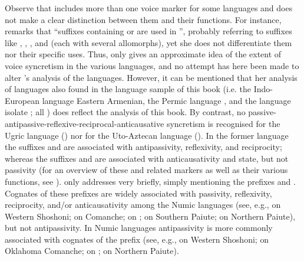 Observe that \citet{geniusiene:1987} includes more than one voice marker for some languages and does not make a clear distinction between them and their functions. For instance, \citet[305]{geniusiene:1987} remarks that “suffixes containing  or  are used in ”, probably referring to suffixes like , , , and  (each with several allomorphs), yet she does not differentiate them nor their specific uses. Thus,  only gives an approximate idea of the extent of voice syncretism in the various languages, and no attempt has here been made to alter \citeauthor{geniusiene:1987}’s analysis of the languages. However, it can be mentioned that her analysis of languages also found in the language sample of this book (i.e. the Indo-European language Eastern Armenian, the Permic language , and the language isolate ; all ) does reflect the analysis of this book. By contrast, no passive-antipassive-reflexive-reciprocal-anticausative syncretism is recognised for the Ugric language  () nor for the Uto-Aztecan language  (). In the former language the suffixes  and  are associated with antipassivity, reflexivity, and reciprocity; whereas the suffixes  and  are associated with anticausativity and  state, but not passivity (for an overview of these and related markers as well as their various functions, see \citealt{karoly:1982}). \citet[306]{geniusiene:1987} only addresses  very briefly, simply mentioning the prefixes  and . Cognates of these prefixes are widely associated with passivity, reflexivity, reciprocity, and/or anticausativity among the Numic languages (see, e.g., \citealt[118ff.]{crum:dayley:1993} on Western Shoshoni; \citealt[125ff.]{charney:1993} on Comanche; \citealt[104ff.]{dayley:1989} on ; \citealt[108ff.]{sapir:1930} on Southern Paiute; \citealt[373ff.]{thornes:2003} on Northern Paiute), but not antipassivity. In Numic languages antipassivity is more commonly associated with cognates of the prefix  (see, e.g., \citealt[122f.]{crum:dayley:1993} on Western Shoshoni; \citealt[128f.]{charney:1993} on Oklahoma Comanche; \citealt[111f.]{dayley:1989} on ; \citealt[379ff.]{thornes:2003} on Northern Paiute). 

